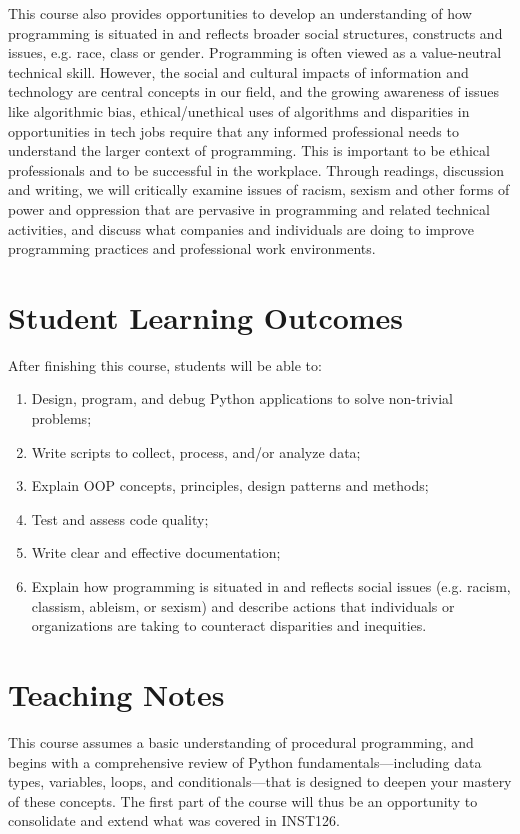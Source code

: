 \documentclass[11pt]{article}
\begin{document}
This course also provides opportunities to develop an understanding of how programming is situated in and reflects broader social structures, constructs and issues, e.g. race, class or gender. Programming is often viewed as a value-neutral technical skill. However, the social and cultural impacts of information and technology are central concepts in our field, and the growing awareness of issues like algorithmic bias, ethical/unethical uses of algorithms and disparities in opportunities in tech jobs require that  any informed professional needs to understand the larger context of programming. This is important to be ethical professionals and to be successful in the workplace. Through readings, discussion and writing, we will critically examine issues of racism, sexism and other forms of power and oppression that are pervasive in programming and related technical activities, and discuss what companies and individuals are doing to improve programming practices and professional work environments.

\section{Student Learning Outcomes}
After finishing this course, students will be able to:
\begin{enumerate}
	\item Design, program, and debug Python applications to solve non-trivial problems;
	\item Write scripts to collect, process, and/or analyze data;
	\item Explain OOP concepts, principles, design patterns and methods;
	\item Test and assess code quality;
	\item Write clear and effective documentation;
	\item Explain how programming is situated in and reflects social issues (e.g. racism, classism, ableism, or sexism) and describe actions that individuals or organizations are taking to counteract disparities and inequities.
\end{enumerate}

\section{Teaching Notes}
This course assumes a basic understanding of procedural programming, and begins with a comprehensive review of Python fundamentals—including data types, variables, loops, and conditionals—that is designed to deepen your mastery of these concepts. The first part of the course will thus be an opportunity to consolidate and extend what was covered in INST126.
\end{document}
